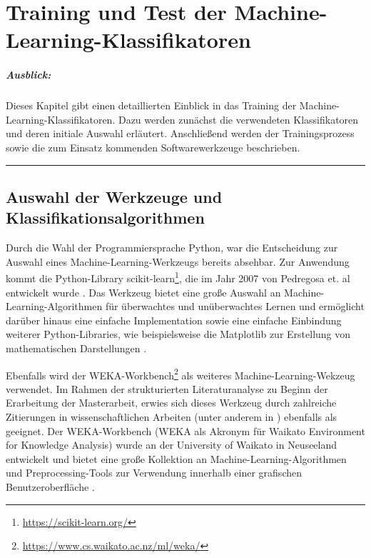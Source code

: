 
\chapter{Training und Test der Machine-Learning-Klassifikatoren}

\paragraph{Ausblick:}
Dieses Kapitel gibt einen detaillierten Einblick in das Training der Machine-Learning-Klassifikatoren. Dazu werden zunächst die verwendeten Klassifikatoren und deren initiale Auswahl erläutert. Anschließend werden der Trainingsprozess sowie die zum Einsatz kommenden Softwarewerkzeuge beschrieben.
\\
\hrule

\section{Auswahl der Werkzeuge und Klassifikationsalgorithmen}

Durch die Wahl der Programmiersprache Python, war die Entscheidung zur Auswahl eines Machine-Learning-Werkzeugs bereits absehbar. Zur Anwendung kommt die Python-Library scikit-learn\footnote{\href{https://scikit-learn.org/}{https://scikit-learn.org/}}, die im Jahr 2007 von Pedregosa et. al entwickelt wurde \cite{scikit}. Das Werkzeug bietet eine große Auswahl an Machine-Learning-Algorithmen für überwachtes und unüberwachtes Lernen und ermöglicht darüber hinaus eine einfache Implementation sowie eine einfache Einbindung weiterer Python-Libraries, wie beispielsweise die Matplotlib zur Erstellung von mathematischen Darstellungen \cite{scikit}.

Ebenfalls wird der WEKA-Workbench\footnote{\href{https://www.cs.waikato.ac.nz/ml/weka/}{https://www.cs.waikato.ac.nz/ml/weka/}} als weiteres Machine-Learning-Wekzeug verwendet. Im Rahmen der strukturierten Literaturanalyse zu Beginn der Erarbeitung der Masterarbeit, erwies sich dieses Werkzeug durch zahlreiche Zitierungen in wissenschaftlichen Arbeiten (unter anderem in \cite{Queiroz2016}) ebenfalls als geeignet. Der WEKA-Workbench (WEKA als Akronym für Waikato Environment for Knowledge Analysis) wurde an der University of Waikato in Neuseeland entwickelt und bietet eine große Kollektion an Machine-Learning-Algorithmen und Preprocessing-Tools zur Verwendung innerhalb einer grafischen Benutzeroberfläche \cite{Weka2016}. 

